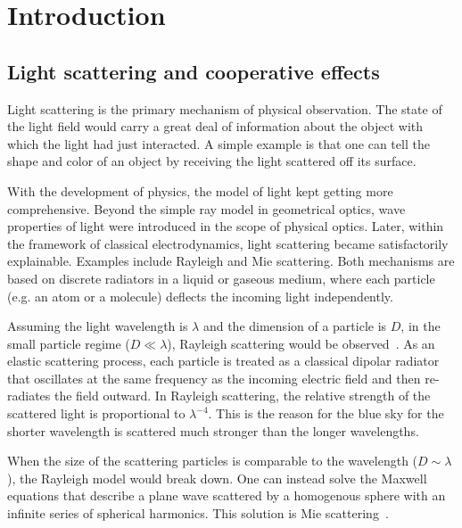 \chapter{Introduction}

\section{Light scattering and cooperative effects}

Light scattering is the primary mechanism of physical observation. The state of the light field would carry a great deal of information about the object with which the light had just interacted. A simple example is that one can tell the shape and color of an object by receiving the light scattered off its surface.

 
With the development of physics, the model of light kept getting more comprehensive. Beyond the simple ray model in geometrical optics, wave properties of light were introduced in the scope of physical optics. Later, within the framework of classical electrodynamics, light scattering became satisfactorily explainable. Examples include Rayleigh and Mie scattering. Both mechanisms are based on discrete radiators in a liquid or gaseous medium, where each particle (e.g. an atom or a molecule) deflects the incoming light independently.

Assuming the light wavelength is $\lambda$ and the dimension of a particle is $D$, in the small particle regime ($D\ll\lambda$), Rayleigh scattering would be observed~\cite{Lilienfeld:04}. As an elastic scattering process, each particle is treated as a classical dipolar radiator that oscillates at the same frequency as the incoming electric field and then re-radiates the field outward. In Rayleigh scattering, the relative strength of the scattered light is proportional to $\lambda^{-4}$. This is the reason for the blue sky for the shorter wavelength is scattered much stronger than the longer wavelengths.

When the size of the scattering particles is comparable to the wavelength ($D\sim\lambda$), the Rayleigh model would break down. One can instead solve the Maxwell equations that describe a plane wave scattered by a homogenous sphere with an infinite series of spherical harmonics. This solution is Mie scattering~\cite{1908AnP...330..377M}. 

